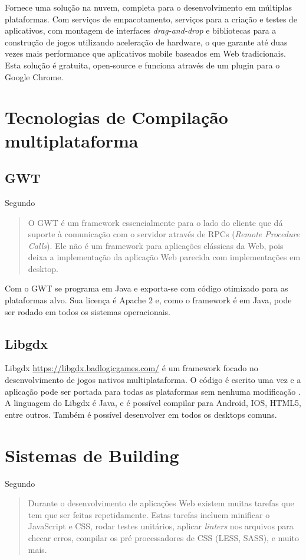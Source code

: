 Fornece uma solução na nuvem, completa para o desenvolvimento em
múltiplas plataformas. Com serviços de empacotamento, serviços
para a criação e testes de aplicativos, com montagem de interfaces
\textit{drag-and-drop} e bibliotecas para a construção de jogos
utilizando aceleração de hardware, o que garante até duas vezes mais
performance que aplicativos mobile baseados em Web tradicionais. Esta
solução é gratuita, open-source e funciona através de um plugin para
o Google Chrome.

\chapter{Tecnologias de Compilação multiplataforma}

\section{GWT}
Segundo \citet[p. 29]{gwt}
\begin{quote}
O GWT é um framework essencialmente para o lado do cliente que dá
suporte à comunicação com o servidor através de RPCs (\textit{Remote
Procedure Calls}). Ele não é um framework para aplicações clássicas
da Web, pois deixa a implementação da aplicação Web parecida com
implementações em desktop.
\end{quote}

Com o GWT se programa em Java e exporta-se com código otimizado para
as plataformas alvo. Sua licença é Apache 2 e, como o framework é em
Java, pode ser rodado em todos os sistemas operacionais.

\section{Libgdx}

Libgdx \url{https://libgdx.badlogicgames.com/} é um framework
focado no desenvolvimento de jogos nativos multiplataforma. O
código é escrito uma vez e a aplicação pode ser portada para
todas as plataformas sem nenhuma modificação \autocite[p.
8]{crossPlatformMobileGameDevelopment}. A linguagem do Libgdx é Java, e
é possível compilar para Android, IOS, HTML5, entre outros. Também é
possível desenvolver em todos os desktops comuns.

\chapter{Sistemas de Building}

Segundo \citet{gruntTutorial}
\begin{quote}
Durante o desenvolvimento de aplicações Web existem muitas tarefas
que tem que ser feitas repetidamente. Estas tarefas incluem minificar o
JavaScript e CSS, rodar testes unitários, aplicar \textit{linters} nos
arquivos para checar erros, compilar os pré processadores de CSS (LESS,
SASS), e muito mais.
\end{quote}

